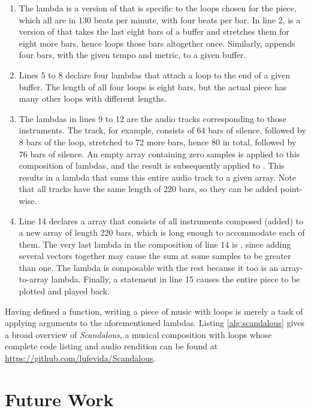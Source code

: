 \begin{enumerate}
	\item The  lambda is a version of  that is specific to the loops chosen for the piece, which all are in 130 beats per minute, with four beats per bar. In line 2,  is a version of  that takes the last eight bars of a buffer and stretches them for eight more bars, hence loops those bars altogether once. Similarly,  appends four bars, with the given tempo and metric, to a given buffer.
	\addtocounter{enumi}{3}
	\item Lines 5 to 8 declare four lambdas that attach a loop to the end of a given buffer. The length of all four loops is eight bars, but the actual piece has many other loops with different lengths.
	\addtocounter{enumi}{3}
	\item The lambdas in lines 9 to 12 are the audio tracks corresponding to those instruments. The  track, for example, consists of 64 bars of silence, followed by 8 bars of the  loop, stretched to 72 more bars, hence 80 in total, followed by 76 bars of silence. An empty array containing zero samples is applied to this composition of lambdas, and the result is subsequently applied to . This results in a lambda that sums this entire audio track to a given array. Note that all tracks have the same length of 220 bars, so they can be added point-wise.
	\addtocounter{enumi}{4}
	\item Line 14 declares a  array that consists of all instruments composed (added) to a new array of length 220 bars, which is long enough to accommodate each of them. The very last lambda in the composition of line 14 is , since adding several vectors together may cause the sum at some samples to be greater than one. The  lambda is composable with the rest because it too is an array-to-array lambda. Finally, a  statement in line 15 causes the entire piece to be plotted and played back.
\end{enumerate}

Having defined a  function, writing a piece of music with loops is merely a task of applying arguments to the aforementioned lambdas. Listing \ref{alg:scandalous} gives a broad overview of \emph{Scandalous}, a musical composition with loops whose complete code listing and audio rendition can be found at \url{https://github.com/lufevida/Scandalous}.

\section{Future Work}

